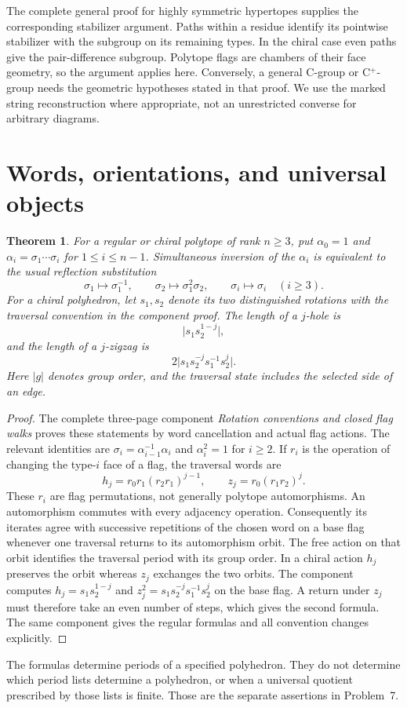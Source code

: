 \documentclass[11pt,a4paper]{article}
\newtheorem{theorem}{Theorem}
\begin{document}
The complete general proof for highly symmetric hypertopes supplies
the corresponding stabilizer argument. Paths within a residue identify
its pointwise stabilizer with the subgroup on its remaining types.
In the chiral case even paths give the pair-difference subgroup.
Polytope flags are chambers of their face geometry, so the argument
applies here. Conversely, a general C-group or C$^+$-group needs the
geometric hypotheses stated in that proof. We use the marked string
reconstruction where appropriate, not an unrestricted converse for
arbitrary diagrams.

\section{Words, orientations, and universal objects}

\begin{theorem}\label{words}
For a regular or chiral polytope of rank $n\ge3$, put
$\alpha_0=1$ and $\alpha_i=\sigma_1\cdots\sigma_i$ for
$1\le i\le n-1$. Simultaneous inversion of the $\alpha_i$ is
equivalent to the usual reflection substitution
\[
 \sigma_1\longmapsto\sigma_1^{-1},\qquad
 \sigma_2\longmapsto\sigma_1^2\sigma_2,\qquad
 \sigma_i\longmapsto\sigma_i\quad(i\ge3).
\]
For a chiral polyhedron, let $s_1,s_2$ denote its two distinguished
rotations with the traversal convention in the component proof.
The length of a $j$-hole is
\[
                  \bigl|s_1s_2^{1-j}\bigr|,
\]
and the length of a $j$-zigzag is
\[
             2\bigl|s_1s_2^{-j}s_1^{-1}s_2^j\bigr|.
\]
Here $|g|$ denotes group order, and the traversal state includes
the selected side of an edge.
\end{theorem}
\begin{proof}
The complete three-page component \emph{Rotation conventions and
closed flag walks} proves these statements by word cancellation
and actual flag actions. The relevant identities are
$\sigma_i=\alpha_{i-1}^{-1}\alpha_i$ and $\alpha_i^2=1$ for
$i\ge2$. If $r_i$ is the operation of changing the type-$i$ face
of a flag, the traversal words are
\[
 h_j=r_0r_1(r_2r_1)^{j-1},\qquad z_j=r_0(r_1r_2)^j.
\]
These $r_i$ are flag permutations, not generally polytope
automorphisms. An automorphism commutes with every adjacency
operation. Consequently its iterates agree with successive
repetitions of the chosen word on a base flag whenever one
traversal returns to its automorphism orbit. The free action
on that orbit identifies the traversal period with its group
order. In a chiral action $h_j$ preserves the orbit whereas
$z_j$ exchanges the two orbits. The component computes
$h_j=s_1s_2^{1-j}$ and
$z_j^2=s_1s_2^{-j}s_1^{-1}s_2^j$ on the base flag. A return
under $z_j$ must therefore take an even number of steps,
which gives the second formula. The same component gives
the regular formulas and all convention changes explicitly.
\end{proof}
The formulas determine periods of a specified polyhedron.
They do not determine which period lists determine a polyhedron,
or when a universal quotient prescribed by those lists is finite.
Those are the separate assertions in Problem~7.
\end{document}
